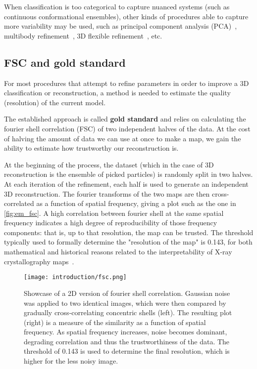 When classification is too categorical to capture nuanced systems (such as continuous conformational ensembles), other kinds of procedures able to capture more variability may be used, such as principal component analysis (PCA)~\cite{castano-diezDynamoFlexibleUserfriendly2012,punjani3DVariabilityAnalysis2021}, multibody refinement~\cite{nakaneMultibodyRefinementCryoEM2021}, 3D flexible refinement~\cite{punjani3DFlexibleRefinement2022}, etc.

\subsection{FSC and gold standard}\label{em_fsc}
For most procedures that attempt to refine parameters in order to improve a 3D classification or reconstruction, a method is needed to estimate the quality (resolution) of the current model.

The established approach is called \textbf{gold standard} and relies on calculating the fourier shell correlation (FSC) of two independent halves of the data.
At the cost of halving the amount of data we can use at once to make a map, we gain the ability to estimate how trustworthy our reconstruction is.

At the beginning of the process, the dataset (which in the case of 3D reconstruction is the ensemble of picked particles) is randomly split in two halves.
At each iteration of the refinement, each half is used to generate an independent 3D reconstruction.
The fourier transforms of the two maps are then cross-correlated as a function of spatial frequency, giving a plot such as the one in \autoref{fig:em_fsc}.
A high correlation between fourier shell at the same spatial frequency indicates a high degree of reproducibility of those frequency components: that is, up to that resolution, the map can be trusted.
The threshold typically used to formally determine the "resolution of the map" is \num{0.143}, for both mathematical and historical reasons related to the interpretability of X-ray crystallography maps~\cite{rosenthalOptimalDeterminationParticle2003}.

\begin{figure}[ht]
    \centering
    \texttt{[image: introduction/fsc.png]}
    \caption[Fourier shell correlation]{Showcase of a 2D version of fourier shell correlation. Gaussian noise was applied to two identical images, which were then compared by gradually cross-correlating concentric shells (left). The resulting plot (right) is a measure of the similarity as a function of spatial frequency. As spatial frequency increases, noise becomes dominant, degrading correlation and thus the trustworthiness of the data. The threshold of \num{0.143} is used to determine the final resolution, which is higher for the less noisy image.}
    \label{fig:em_fsc}
\end{figure}

